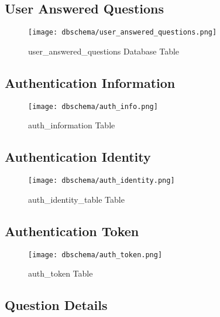 \subsection{User Answered Questions}

\begin{figure}[H]
\begin{center}
\texttt{[image: dbschema/user\_answered\_questions.png]}
\end{center}
\caption{ user\_answered\_questions Database Table}
\label{db_user_answered_questions}
\end{figure}

\subsection{Authentication Information}

\begin{figure}[H]
\begin{center}
\texttt{[image: dbschema/auth\_info.png]}
\end{center}
\caption{ auth\_information Table}
\label{auth_information_table}
\end{figure}


\subsection{Authentication Identity}

\begin{figure}[H]
\begin{center}
\texttt{[image: dbschema/auth\_identity.png]}
\end{center}
\caption{ auth\_identity\_table Table}
\label{auth_identity_table}
\end{figure}

\subsection{Authentication Token}

\begin{figure}[H]
\begin{center}
\texttt{[image: dbschema/auth\_token.png]}
\end{center}
\caption{ auth\_token Table}
\label{auth_token_table}
\end{figure}


\subsection{Question Details}

